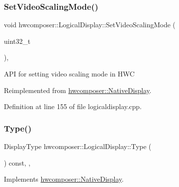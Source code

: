 \subsubsection{\texorpdfstring{Set\+Video\+Scaling\+Mode()}{SetVideoScalingMode()}}
{\footnotesize\ttfamily void hwcomposer\+::\+Logical\+Display\+::\+Set\+Video\+Scaling\+Mode (\begin{DoxyParamCaption}\item[{uint32\+\_\+t}]{ }\end{DoxyParamCaption})\hspace{0.3cm}{\ttfamily [override]}, {\ttfamily [virtual]}}

A\+PI for setting video scaling mode in H\+WC 

Reimplemented from \mbox{\hyperlink{classhwcomposer_1_1NativeDisplay_ad35507d4c266627b1b20a0ebd116f907}{hwcomposer\+::\+Native\+Display}}.



Definition at line 155 of file logicaldisplay.\+cpp.


\begin{DoxyCode}{0}
\end{DoxyCode}
\mbox{\label{classhwcomposer_1_1LogicalDisplay_a012b2a742cfd590405db34ff68f919a9}} 
\subsubsection{\texorpdfstring{Type()}{Type()}}
{\footnotesize\ttfamily Display\+Type hwcomposer\+::\+Logical\+Display\+::\+Type (\begin{DoxyParamCaption}{ }\end{DoxyParamCaption}) const\hspace{0.3cm}{\ttfamily [inline]}, {\ttfamily [override]}, {\ttfamily [virtual]}}



Implements \mbox{\hyperlink{classhwcomposer_1_1NativeDisplay_a67018275066174f9e5d4b801cd6fea31}{hwcomposer\+::\+Native\+Display}}.




